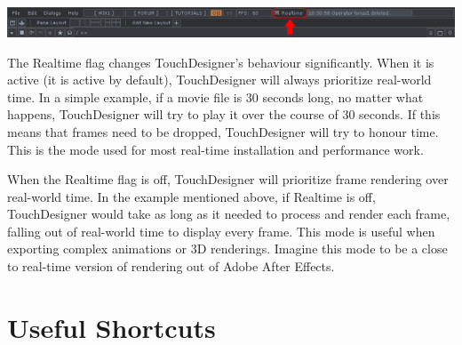 \begin{fullwidth}

\begin{center}
\includegraphics{./img/2.8/realtime-1.png}
\end{center}

The Realtime flag changes TouchDesigner's behaviour significantly. When it is active (it is active by default), TouchDesigner will always prioritize real-world time. In a simple example, if a movie file is 30 seconds long, no matter what happens, TouchDesigner will try to play it over the course of 30 seconds. If this means that frames need to be dropped, TouchDesigner will try to honour time. This is the mode used for most real-time installation and performance work. 

When the Realtime flag is off, TouchDesigner will prioritize frame rendering over real-world time. In the example mentioned above, if Realtime is off, TouchDesigner would take as long as it needed to process and render each frame, falling out of real-world time to display every frame. This mode is useful when exporting complex animations or 3D renderings. Imagine this mode to be a close to real-time version of rendering out of Adobe After Effects. 


\end{fullwidth}
\section{Useful Shortcuts}

